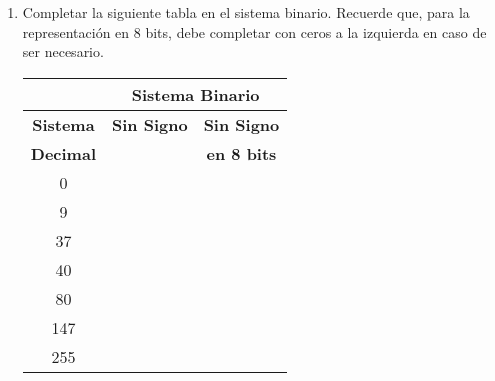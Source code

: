 \documentclass[12pt]{article}
\begin{document}
\begin{enumerate}

    \item Completar la siguiente tabla en el sistema binario. Recuerde que,
        para la representación en 8 bits, debe completar con ceros a la
        izquierda en caso de ser necesario.

    \begin{center}

        \begin{tabular}[t]{|c|c|c|}

        \cline{2-3}

            \multicolumn{1}{c}{}&\multicolumn{2}{|c|}{\textbf{Sistema Binario}}\\

        \hline

            \textbf{Sistema} & \textbf{Sin Signo}& \textbf{Sin Signo}\\

            \textbf{Decimal} & ~ & \textbf{en 8 bits}\\

        \hline

            0 & \hspace{14em}~&\hspace{14em}~\\

        \hline

            9&&\\

        \hline

            37&&\\

        \hline

            40&&\\

        \hline

            80&&\\

        \hline

            147&&\\

        \hline

            255&&\\

        \hline

        \end{tabular}

    \end{center}


\end{enumerate}
\end{document}
